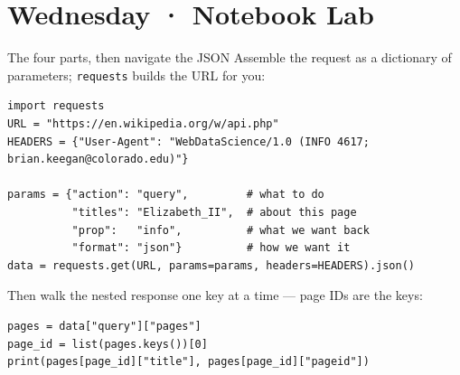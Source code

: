 \documentclass[9pt,aspectratio=169]{beamer}
\begin{document}
\section{Wednesday · Notebook Lab}

\begin{frame}[fragile]{The four parts, then navigate the JSON}
    Assemble the request as a dictionary of parameters; \texttt{requests} builds the URL for you:
\begin{lstlisting}
import requests
URL = "https://en.wikipedia.org/w/api.php"
HEADERS = {"User-Agent": "WebDataScience/1.0 (INFO 4617; brian.keegan@colorado.edu)"}

params = {"action": "query",         # what to do
          "titles": "Elizabeth_II",  # about this page
          "prop":   "info",          # what we want back
          "format": "json"}          # how we want it
data = requests.get(URL, params=params, headers=HEADERS).json()
\end{lstlisting}
    Then walk the nested response one key at a time --- page IDs are the keys:
\begin{lstlisting}
pages = data["query"]["pages"]
page_id = list(pages.keys())[0]
print(pages[page_id]["title"], pages[page_id]["pageid"])
\end{lstlisting}
\end{frame}
\end{document}
